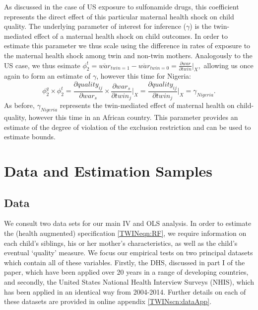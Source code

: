 \documentclass[subeqn]{article}
\begin{document}
\begin{spacing}{1.4}
As discussed in the case of US exposure to sulfonamide drugs, this coefficient
represents the direct effect of this particular maternal health shock on child
quality.  The underlying parameter of interest for inference ($\gamma$) is the
twin-mediated effect of a maternal health shock on child outcomes.  In order
to estimate this parameter we thus scale using the difference in rates of
exposure to the maternal health shock among twin and non-twin mothers.
Analogously to the US case, we thus esimate $\phi_2^t=\overline{war}_{twin=1}
-\overline{war}_{twin=0}=\frac{\partial war}{\partial twin}\bigg|_{X},$ allowing
us once again to form an estimate of $\gamma$, however this time for Nigeria:
\begin{equation}
  \label{TWINeqn:realgammaN}
  \phi_2^q\times\phi_2^t=\frac{\partial quality_{ij}}{\partial war_s}\times
  \frac{\partial war_s}{\partial twin_j}\bigg|_{X}=
  \frac{\partial quality_{ij}}{\partial twin_j}\bigg|_{X}=\gamma_{Nigeria}.
\end{equation}
As before, $\gamma_{Nigeria}$ represents the twin-mediated effect of
maternal health on child-quality, however this time in an African country.
This parameter provides an estimate of the degree of violation of the
exclusion restriction and can be used to estimate \citet{Conleyetal2012}
bounds.


\section{Data and Estimation Samples}              \label{TWINscn:data}
\subsection{Data}                                  \label{TWINsscn:data}
We consult two data sets for our main IV and OLS analysis. In order to estimate
the (health augmented) specification \ref{TWINeqn:RF}, we require information on
each child's siblings, his or her mother's characteristics, as well as the
child's eventual `quality' measure. We focus our empirical tests on two
principal datasets which contain all of these variables.  Firstly, the DHS,
discussed in part I of the paper, which have been applied over 20 years in a
range of developing countries, and secondly, the United States National Health
Interview Surveys (NHIS), which has been applied in an identical way from
2004-2014.  Further details on each of these datasets are provided in online
appendix \ref{TWINscn:dataApp}.


\end{spacing}
\end{document}
